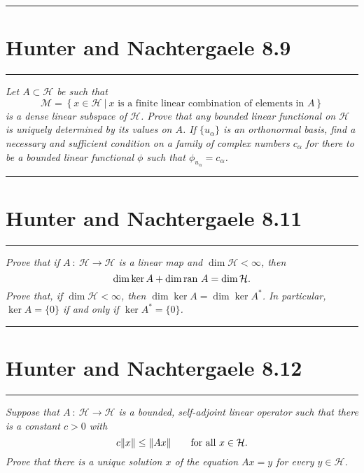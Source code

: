 \documentclass{article} %
\theoremstyle{plain}
\newcommand{\ran}{\text{\rm ran }}
\newcommand{\problem}[1]{
\vspace{.375cm}
\begin{minipage}{\textwidth}
    \begin{center}
        \noindent\rule{5cm}{1pt}
    \end{center}
    \section{\bf #1}
    \begin{center}
        \noindent\rule{5cm}{1pt}
    \end{center}
    \vspace{0.25cm}
\end{minipage}
}
\numberwithin{equation}{section} %
\numberwithin{figure}{section} %
\numberwithin{table}{section} %
\begin{document}
\problem{Hunter and Nachtergaele 8.9}
\emph{Let $A \subset \mathcal{H}$ be such that $$\mathcal{M} = \left\{x \in \mathcal{H}\ |\ x \text{ is a finite linear combination of elements in $A$}\right\}$$ is a dense linear subspace of $\mathcal{H}$.  Prove that any bounded linear functional on $\mathcal{H}$ is uniquely determined by its values on $A$.  If $\{u_\alpha\}$ is an orthonormal basis, find a necessary and sufficient condition on a family of complex numbers $c_\alpha$ for there to be a bounded linear functional $\phi$ such that $\phi_{u_\alpha} = c_\alpha$.}










\problem{Hunter and Nachtergaele 8.11}
\emph{Prove that if $A\ :\ \mathcal{H} \rightarrow \mathcal{H}$ is a linear map and $\dim \mathcal{H} < \infty$, then $$\dim \ker A + \dim \ran A = \dim \mathcal{H}.$$  Prove that, if $\dim \mathcal{H} < \infty$, then $\dim \ker A = \dim \ker A^*$.  In particular, $\ker A = \{0\}$ if and only if $\ker A^* = \{0\}$.}










\problem{Hunter and Nachtergaele 8.12}
\emph{Suppose that $A\ :\ \mathcal{H} \rightarrow \mathcal{H}$ is a bounded, self-adjoint linear operator such that there is a constant $c > 0$ with $$c\norm{x} \leq \norm{Ax} \qquad \text{for all } x \in \mathcal{H}.$$  Prove that there is a unique solution $x$ of the equation $Ax = y$ for every $y \in \mathcal{H}$.}
\end{document}

